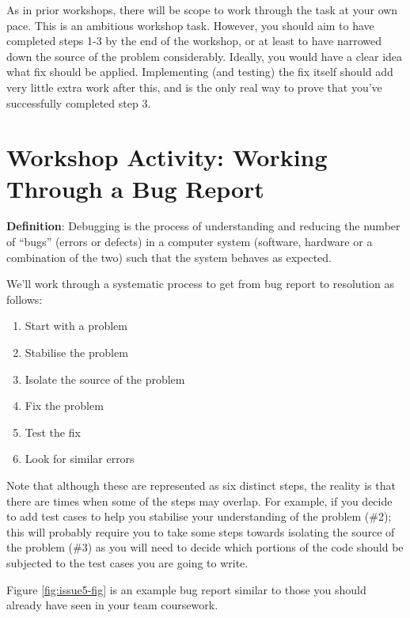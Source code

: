 \documentclass[
]{book}
\providecommand{\tightlist}{%
  \setlength{\itemsep}{0pt}\setlength{\parskip}{0pt}}
\begin{document}
As in prior workshops, there will be scope to work through the task at your own pace. This is an ambitious workshop task. However, you should aim to have completed steps 1-3 by the end of the workshop, or at least to have narrowed down the source of the problem considerably. Ideally, you would have a clear idea what fix should be applied. Implementing (and testing) the fix itself should add very little extra work after this, and is the only real way to prove that you've successfully completed step 3.

\hypertarget{workshop-activity-working-through-a-bug-report}{%
\section{Workshop Activity: Working Through a Bug Report}\label{workshop-activity-working-through-a-bug-report}}

\textbf{Definition}: Debugging is the process of understanding and reducing the number of ``bugs'' (errors or defects) in a computer system (software, hardware or a combination of the two) such that the system behaves as expected.

We'll work through a systematic process to get from bug report to resolution as follows:

\begin{enumerate}
\def\labelenumi{\arabic{enumi}.}
\tightlist
\item
  Start with a problem
\item
  Stabilise the problem
\item
  Isolate the source of the problem
\item
  Fix the problem
\item
  Test the fix
\item
  Look for similar errors
\end{enumerate}

Note that although these are represented as six distinct steps, the reality is that there are times when some of the steps may overlap. For example, if you decide to add test cases to help you stabilise your understanding of the problem (\#2); this will probably require you to take some steps towards isolating the source of the problem (\#3) as you will need to decide which portions of the code should be subjected to the test cases you are going to write.

Figure \ref{fig:issue5-fig} is an example bug report similar to those you should already have seen in your team coursework.
\end{document}
